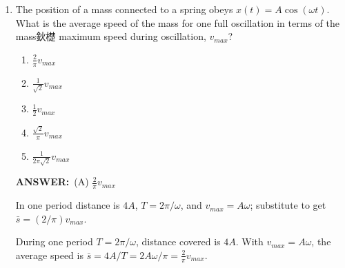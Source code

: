 ﻿\documentclass[12pt, a4paper]{article}
\makeatletter
\newcommand{\finalanswer}[1]{\textbf{ANSWER:}~#1}
\newif\if@categoryprinted
\newcommand{\category}[1]{\if@categoryprinted\relax\else\textit{\textcolor{gray}{Category: #1}}\global\@categoryprintedtrue\fi}
\makeatother
\begin{document}
\begin{CJK*}{UTF8}{gbsn}
\begin{enumerate}[itemsep=1.0em, topsep=0.6em]
\category{Statics}
\begin{answerbox}
\finalanswer{(C) Oriented at $90^\circ-\theta$ clockwise from +x}
\end{answerbox}
\begin{solutionbox}
With $|\vec F_g|=|\vec N|=|\vec F_a|$, the forces form an equilateral triangle. Geometry of components shows the applied force must be directed $90^\circ-\theta$ clockwise from +x so that the vector sum is zero.
\end{solutionbox}

\item \label{prob:24}
The position of a mass connected to a spring obeys $x(t) = A \cos(\omega t)$. What is the average speed of the mass for one full oscillation in terms of the mass鈥檚 maximum speed during oscillation, $v_{max}$?
\begin{enumerate}[label=(\Alph*)]
    \item $\frac{2}{\pi} v_{max}$
    \item $\frac{1}{\sqrt{2}} v_{max}$
    \item $\frac{1}{2} v_{max}$
    \item $\frac{\sqrt{2}}{\pi} v_{max}$
    \item $\frac{1}{2\pi\sqrt{2}} v_{max}$
\end{enumerate}

\category{Oscillations}
\begin{answerbox}
\finalanswer{(A) $\tfrac{2}{\pi}v_{max}$}
\end{answerbox}
\begin{insightbox}
In one period distance is $4A$, $T=2\pi/\omega$, and $v_{max}=A\omega$; substitute to get $\bar s=(2/\pi)v_{max}$.
\end{insightbox}
\begin{solutionbox}

During one period $T=2\pi/\omega$, distance covered is $4A$. With $v_{max}=A\omega$, the average speed is $\bar s=4A/T=2A\omega/\pi=\tfrac{2}{\pi}v_{max}$.
\end{solutionbox}

\newpage


\end{enumerate}
\end{CJK*}
\end{document}
